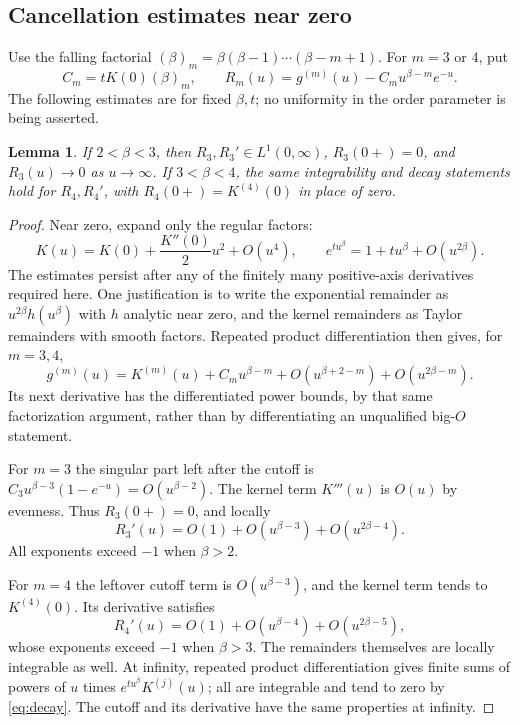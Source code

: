 \documentclass[11pt]{article}
\newtheorem{lemma}[theorem]{Lemma}
\theoremstyle{remark}\newtheorem{remark}[theorem]{Remark}
\begin{document}
\subsection{Cancellation estimates near zero}
Use the falling factorial $(\beta)_m=\beta(\beta-1)\cdots(\beta-m+1)$.
For $m=3$ or $4$, put
\begin{equation}\label{eq:remainder}
 C_m=tK(0)(\beta)_m,\qquad
 R_m(u)=g^{(m)}(u)-C_m u^{\beta-m}e^{-u}.
\end{equation}
The following estimates are for fixed $\beta,t$; no uniformity in
the order parameter is being asserted.

\begin{lemma}\label{lem:cancel}
If $2<\beta<3$, then $R_3,R_3'\in L^1(0,\infty)$,
$R_3(0+)=0$, and $R_3(u)\to0$ as $u\to\infty$.
If $3<\beta<4$, the same integrability and decay statements hold for
$R_4,R_4'$, with $R_4(0+)=K^{(4)}(0)$ in place of zero.
\end{lemma}
\begin{proof}
Near zero, expand only the regular factors:
\[
 K(u)=K(0)+\frac{K''(0)}2u^2+O(u^4),
 \qquad e^{tu^\beta}=1+tu^\beta+O(u^{2\beta}).
\]
The estimates persist after any of the finitely many positive-axis
derivatives required here. One justification is to write the
exponential remainder as $u^{2\beta}h(u^\beta)$ with $h$ analytic
near zero, and the kernel remainders as Taylor remainders with smooth
factors. Repeated product differentiation then gives, for $m=3,4$,
\begin{equation}\label{eq:expansion}
 g^{(m)}(u)=K^{(m)}(u)+C_m u^{\beta-m}
 +O(u^{\beta+2-m})+O(u^{2\beta-m}).
\end{equation}
Its next derivative has the differentiated power bounds, by that
same factorization argument, rather than by differentiating an
unqualified big-$O$ statement.

For $m=3$ the singular part left after the cutoff is
$C_3u^{\beta-3}(1-e^{-u})=O(u^{\beta-2})$.
The kernel term $K'''(u)$ is $O(u)$ by evenness.
Thus $R_3(0+)=0$, and locally
\[
 R_3'(u)=O(1)+O(u^{\beta-3})+O(u^{2\beta-4}).
\]
All exponents exceed $-1$ when $\beta>2$.

For $m=4$ the leftover cutoff term is $O(u^{\beta-3})$,
and the kernel term tends to $K^{(4)}(0)$. Its derivative satisfies
\[
 R_4'(u)=O(1)+O(u^{\beta-4})+O(u^{2\beta-5}),
\]
whose exponents exceed $-1$ when $\beta>3$.
The remainders themselves are locally integrable as well.
At infinity, repeated product differentiation gives finite sums of
powers of $u$ times $e^{tu^\beta}K^{(j)}(u)$; all are integrable
and tend to zero by \eqref{eq:decay}. The cutoff and its derivative
have the same properties at infinity.
\end{proof}
\end{document}
